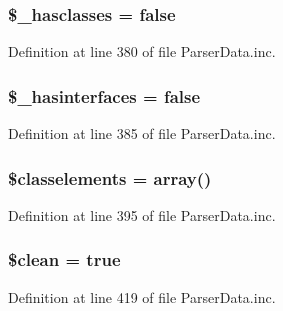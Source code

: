 \hypertarget{classparser_data_a85704b1e3e7a2a2dfa5afbfbbe7df427}{
\subsubsection[{\$\-\_\-hasclasses}]{\setlength{\rightskip}{0pt plus 5cm}\$\-\_\-hasclasses = false}}\label{classparser_data_a85704b1e3e7a2a2dfa5afbfbbe7df427}


\-Definition at line 380 of file \-Parser\-Data.\-inc.

\hypertarget{classparser_data_a746437a3e5ef01d41a1a64ba01bcc8a4}{
\subsubsection[{\$\-\_\-hasinterfaces}]{\setlength{\rightskip}{0pt plus 5cm}\$\-\_\-hasinterfaces = false}}\label{classparser_data_a746437a3e5ef01d41a1a64ba01bcc8a4}


\-Definition at line 385 of file \-Parser\-Data.\-inc.

\hypertarget{classparser_data_a16a5f43c92515df612ca69fdfa7fe1fa}{
\subsubsection[{\$classelements}]{\setlength{\rightskip}{0pt plus 5cm}\$classelements = array()}}\label{classparser_data_a16a5f43c92515df612ca69fdfa7fe1fa}


\-Definition at line 395 of file \-Parser\-Data.\-inc.

\hypertarget{classparser_data_a65f6a20f0163f9eb687b6285bd140789}{
\subsubsection[{\$clean}]{\setlength{\rightskip}{0pt plus 5cm}\$clean = true}}\label{classparser_data_a65f6a20f0163f9eb687b6285bd140789}


\-Definition at line 419 of file \-Parser\-Data.\-inc.

